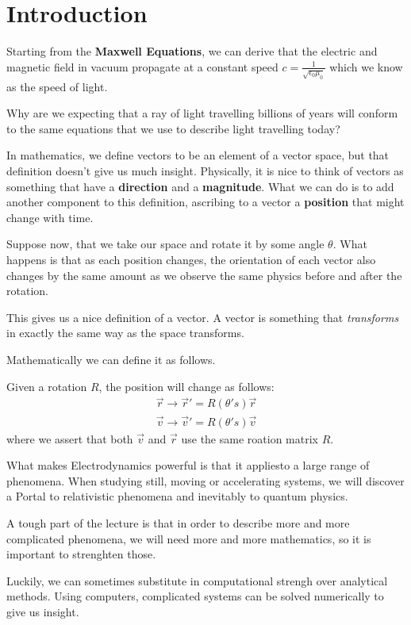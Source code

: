 \section{Introduction}

Starting from the \textbf{Maxwell Equations}, we can derive that the electric and magnetic field in vacuum propagate at a constant speed $c = \frac{1}{ \sqrt{\epsilon_0 \mu_0}}$ which we know as the speed of light.

Why are we expecting that a ray of light travelling billions of years will conform to the same equations that we use to describe light travelling today?

In mathematics, we define vectors to be an element of a vector space, but that definition doesn't give us much insight.
Physically, it is nice to think of vectors as something that have a \textbf{direction} and a \textbf{magnitude}.
What we can do is to add another component to this definition, ascribing to a vector a \textbf{position} that might change with time.

Suppose now, that we take our space and rotate it by some angle $\theta$. 
What happens is that as each position changes, the orientation of each vector also changes by the same amount as we observe the same physics before and after the rotation.

This gives us a nice definition of a vector. A vector is something that \emph{transforms} in exactly the same way as the space transforms.

Mathematically we can define it as follows.

Given a rotation $R$, the position will change as follows:
\begin{align*}
  \vec{r} \to \vec{r}' = R(\theta' s) \vec{r}\\
  \vec{v} \to  \vec{v}' = R(\theta' s) \vec{v}
\end{align*}
where we assert that both $\vec{v}$ and $\vec{r}$ use the same roation matrix $R$.

What makes Electrodynamics powerful is that it appliesto a large range of phenomena.
When studying still, moving or accelerating systems, we will discover a Portal to relativistic phenomena and inevitably to quantum physics.

A tough part of the lecture is that in order to describe more and more complicated phenomena, we will need more and more mathematics, so it is important to strenghten those.

Luckily, we can sometimes substitute in computational strengh over analytical methods. Using computers, complicated systems can be solved numerically to give us insight.

